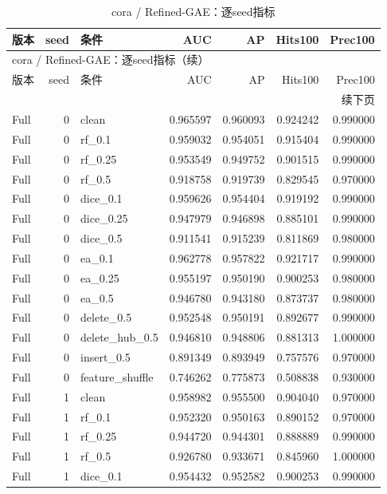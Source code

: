 \documentclass[UTF8,a4paper,11pt,fontset=fandol]{ctexart}
\begin{document}
{\footnotesize
\setlength{\tabcolsep}{3pt}
\begin{longtable}{lrlrrrr}
\caption{cora / Refined-GAE：逐seed指标}\\
\toprule
版本 & seed & 条件 & AUC & AP & Hits100 & Prec100 \\
\midrule
\endfirsthead
\multicolumn{7}{l}{cora / Refined-GAE：逐seed指标（续）}\\
\toprule
版本 & seed & 条件 & AUC & AP & Hits100 & Prec100 \\
\midrule
\endhead
\midrule\multicolumn{7}{r}{续下页}\\
\endfoot
\bottomrule\endlastfoot
Full & 0 & clean & 0.965597 & 0.960093 & 0.924242 & 0.990000 \\
Full & 0 & rf\_0.1 & 0.959032 & 0.954051 & 0.915404 & 0.990000 \\
Full & 0 & rf\_0.25 & 0.953549 & 0.949752 & 0.901515 & 0.990000 \\
Full & 0 & rf\_0.5 & 0.918758 & 0.919739 & 0.829545 & 0.970000 \\
Full & 0 & dice\_0.1 & 0.959626 & 0.954404 & 0.919192 & 0.990000 \\
Full & 0 & dice\_0.25 & 0.947979 & 0.946898 & 0.885101 & 0.990000 \\
Full & 0 & dice\_0.5 & 0.911541 & 0.915239 & 0.811869 & 0.980000 \\
Full & 0 & ea\_0.1 & 0.962778 & 0.957822 & 0.921717 & 0.990000 \\
Full & 0 & ea\_0.25 & 0.955197 & 0.950190 & 0.900253 & 0.980000 \\
Full & 0 & ea\_0.5 & 0.946780 & 0.943180 & 0.873737 & 0.980000 \\
Full & 0 & delete\_0.5 & 0.952548 & 0.950191 & 0.892677 & 0.990000 \\
Full & 0 & delete\_hub\_0.5 & 0.946810 & 0.948806 & 0.881313 & 1.000000 \\
Full & 0 & insert\_0.5 & 0.891349 & 0.893949 & 0.757576 & 0.970000 \\
Full & 0 & feature\_shuffle & 0.746262 & 0.775873 & 0.508838 & 0.930000 \\
Full & 1 & clean & 0.958982 & 0.955500 & 0.904040 & 0.970000 \\
Full & 1 & rf\_0.1 & 0.952320 & 0.950163 & 0.890152 & 0.970000 \\
Full & 1 & rf\_0.25 & 0.944720 & 0.944301 & 0.888889 & 0.990000 \\
Full & 1 & rf\_0.5 & 0.926780 & 0.933671 & 0.845960 & 1.000000 \\
Full & 1 & dice\_0.1 & 0.954432 & 0.952582 & 0.900253 & 0.990000 \\

\end{longtable}}
\end{document}
